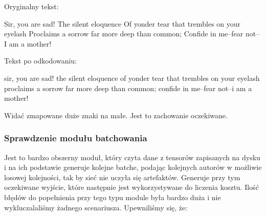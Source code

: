 	Oryginalny tekst:
	\begin{bash}
 Sir, you are sad! The silent eloquence
 Of yonder tear that trembles on your eyelash
 Proclaims a sorrow far more deep than common;
 Confide in me--fear not--I am a mother!
	\end{bash}
	
	Tekst po odkodowaniu: 
	\begin{bash}
sir, you are sad! the silent eloquence
of yonder tear that trembles on your eyelash
proclaims a sorrow far more deep than common;
confide in me--fear not--i am a mother!
	\end{bash}
	Widać zmapowane duże znaki na małe. Jest to zachowanie oczekiwane.
	
\subsubsection{Sprawdzenie modułu batchowania}
	  Jest to bardzo obszerny moduł, który czyta dane z tensorów zapisanych na dysku
	  i na ich podstawie generuje kolejne batche, podając kolejnych autorów w możliwie losowej kolejności, tak by sieć
	  nie uczyła się artefaktów. Generuje przy tym oczekiwane wyjście, które następnie jest wykorzystywane do 
	  liczenia kosztu. Ilość błędów do popełnienia przy tego typu module była bardzo duża i nie wykluczalaliśmy
	  żadnego scenariusza. Upewniliśmy się, że:
